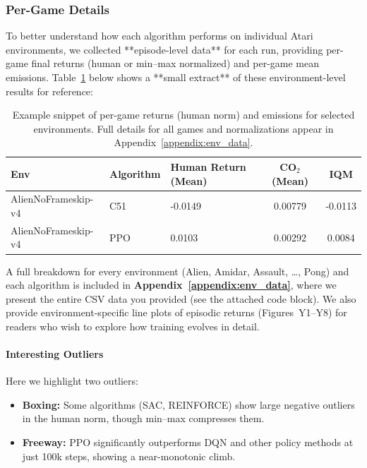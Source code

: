 \subsubsection{Per-Game Details}
To better understand how each algorithm performs on individual Atari environments, 
we collected **episode-level data** for each run, providing per-game final returns 
(human or min--max normalized) and per-game mean emissions. Table~\ref{tab:per_game_example}
below shows a **small extract** of these environment-level results for reference:
\begin{table}[htbp]
	\centering
	\caption{Example snippet of per-game returns (human norm) and emissions for selected environments. 
		Full details for all games and normalizations appear in Appendix~\ref{appendix:env_data}.}
	\label{tab:per_game_example}
	\begin{tabular}{lllcc}
		\toprule
		\textbf{Env} & \textbf{Algorithm} & \textbf{Human Return (Mean)} & \textbf{CO$_2$ (Mean)} & \textbf{IQM} \\
		\midrule
		AlienNoFrameskip-v4 & C51 & -0.0149 & 0.00779 & -0.0113 \\
		AlienNoFrameskip-v4 & PPO & 0.0103 & 0.00292 & 0.0084 \\
		\bottomrule
	\end{tabular}
\end{table}

\noindent
A full breakdown for every environment (Alien, Amidar, Assault, \ldots, Pong) 
and each algorithm is included in \textbf{Appendix~\ref{appendix:env_data}}, 
where we present the entire CSV data you provided (see the attached code block).
We also provide environment-specific line plots of episodic returns (Figures~Y1–Y8)
for readers who wish to explore how training evolves in detail.

\paragraph{Interesting Outliers}
Here we highlight two outliers:
\begin{itemize}
	\item \textbf{Boxing:} Some algorithms (SAC, REINFORCE) show large negative outliers 
	in the human norm, though min–max compresses them. 
	\item \textbf{Freeway:} PPO significantly outperforms DQN and other policy methods 
	at just 100k steps, showing a near-monotonic climb.
\end{itemize}

